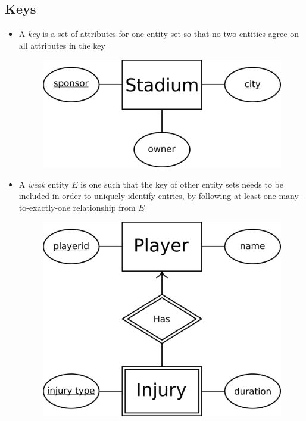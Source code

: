 \documentclass[a4paper]{article}
\begin{document}
\subsection{Keys}
\begin{itemize}
\item A \emph{key} is a set of attributes for one entity set so that no two entities agree on all attributes in the key
\begin{figure}[H]
\centering
\includegraphics[width=0.3\linewidth]{entity13.png}
\end{figure}
\item A \emph{weak} entity $E$ is one such that the key of other entity sets needs to be included in order to uniquely identify entries, by following at least one many-to-exactly-one relationship from $E$
\begin{figure}[H]
\centering
\includegraphics[width=0.3\linewidth]{entity14.png}
\end{figure}
\end{itemize}
\end{document}
